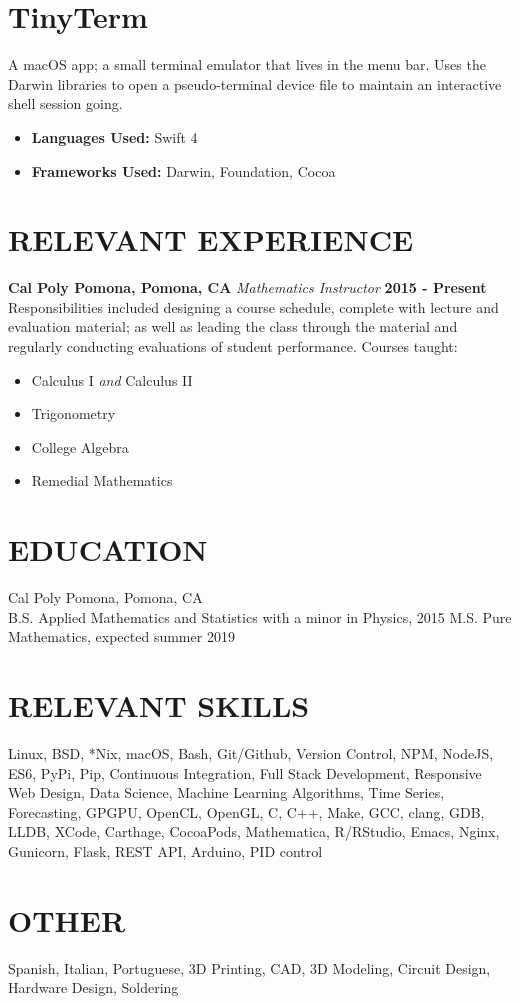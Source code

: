 \documentclass[margin]{res}
\begin{document}
\begin{resume}
\normalsize{\section{TinyTerm}} A macOS app; a small terminal emulator that
lives in the menu bar. Uses the Darwin libraries to open a pseudo-terminal
device file to maintain an interactive shell session going.
\begin{itemize}
\item {\bf Languages Used: } Swift 4
\item {\bf Frameworks Used: } Darwin, Foundation, Cocoa
\end{itemize}

\section{RELEVANT EXPERIENCE}
{\bf Cal Poly Pomona, Pomona, CA}\newline
{\it Mathematics Instructor}\newline
{\bf 2015 - Present}\newline
Responsibilities included designing a course schedule, complete with lecture and
evaluation material; as well as leading the class through the material and
regularly conducting evaluations of student performance.\newline
Courses taught:
\begin{multicols}{2}
\begin{itemize}
\item Calculus I {\it and} Calculus II
\item Trigonometry
  \columnbreak
\item College Algebra
\item Remedial Mathematics
\end{itemize}
\end{multicols}

\section{EDUCATION}
Cal Poly Pomona, Pomona, CA \\
B.S. Applied Mathematics and Statistics with a minor in Physics, 2015 \newline
M.S. Pure Mathematics, expected summer 2019

  \section{RELEVANT SKILLS}
  Linux, BSD, *Nix, macOS, Bash, Git/Github, Version Control, NPM, NodeJS, ES6, PyPi, Pip, Continuous Integration,
  Full Stack Development, Responsive Web Design, Data Science, Machine Learning Algorithms, Time Series, Forecasting,
  GPGPU, OpenCL, OpenGL, C, C++, Make, GCC, clang, GDB, LLDB, XCode, Carthage,
  CocoaPods, Mathematica, R/RStudio, Emacs, Nginx, Gunicorn, Flask, REST API, Arduino, PID control

  \section{OTHER}
  Spanish, Italian, Portuguese, 3D Printing, CAD, 3D Modeling, Circuit Design,
  Hardware Design, Soldering 
 
\end{resume}
\end{document}
